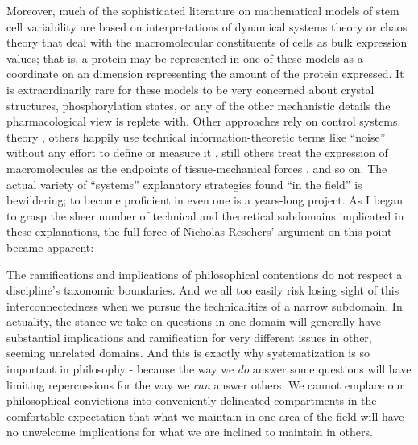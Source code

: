 \documentclass{ut-thesis}
\begin{document}
\begin{NoHyper}
Moreover, much of the sophisticated literature on mathematical models of stem cell variability are based on interpretations of dynamical systems theory or chaos theory \cite{Furusawa2012,Huang2017} that deal with the macromolecular constituents of cells as bulk expression values; that is, a protein may be represented in one of these models as a coordinate on an dimension representing the amount of the protein expressed. It is extraordinarily rare for these models to be very concerned about crystal structures, phosphorylation states, or any of the other mechanistic details the pharmacological view is replete with. Other approaches rely on control systems theory \cite{Sun2015,Yang2015a}, others happily use technical information-theoretic terms like ``noise'' without any effort to define or measure it \cite{Chang2008}, still others treat the expression of macromolecules as the endpoints of tissue-mechanical forces \cite{Peng2017}, and so on. The actual variety of ``systems'' explanatory strategies found ``in the field'' is bewildering; to become proficient in even one is a years-long project. As I began to grasp the sheer number of technical and theoretical subdomains implicated in these explanations, the full force of Nicholas Reschers' argument on this point became apparent: 

\begin{longquote}
The ramifications and implications of philosophical contentions do not respect a discipline's taxonomic boundaries. And we all too easily risk losing sight of this interconnectedness when we pursue the technicalities of a narrow subdomain. In actuality, the stance we take on questions in one domain will generally have substantial implications and ramification for very different issues in other, seeming unrelated domains. And this is exactly why systematization is so important in philosophy - because the way we \textit{do} answer some questions will have limiting repercussions for the way we \textit{can} answer others. We cannot emplace our philosophical convictions into conveniently delineated compartments in the comfortable expectation that what we maintain in one area of the field will have no unwelcome implications for what we are inclined to maintain in others.
\cite[p.97]{Rescher2005}
\end{longquote}


\end{NoHyper}
\end{document}
